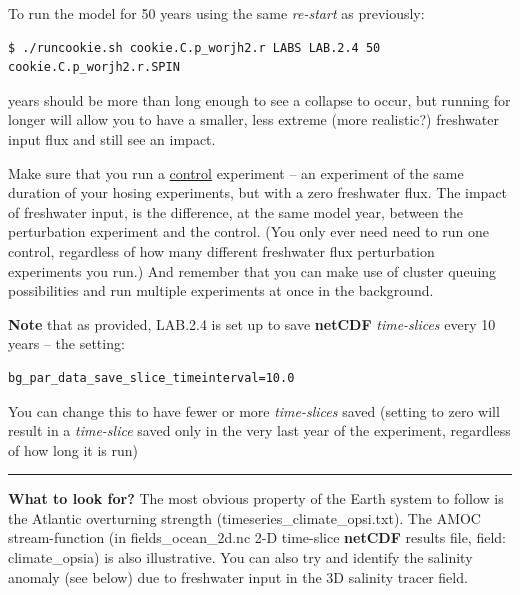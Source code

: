 \vspace{1mm}
To run the model for 50 years using the same \textit{re-start} as previously:

\vspace{-2mm}\small\begin{verbatim}
$ ./runcookie.sh cookie.C.p_worjh2.r LABS LAB.2.4 50 cookie.C.p_worjh2.r.SPIN
\end{verbatim}\normalsize\vspace{-2mm}

 years should be more than long enough to see a collapse to occur, but running for longer will allow you to have a smaller, less extreme (more realistic?) freshwater input flux and still see an impact.

Make sure that you run a \uline{control} experiment -- an experiment of the same duration of your hosing experiments, but with a zero freshwater flux. The impact of freshwater input, is the difference, at the same model year, between the perturbation experiment and the control. (You only ever need need to run one control, regardless of how many different freshwater flux perturbation experiments  you run.) And remember that you can make use of cluster queuing possibilities and run multiple experiments at once in the background.

\vspace{1mm}
\noindent \textbf{Note} that as provided, \textsf{\footnotesize LAB.2.4} is set up to save \textbf{netCDF} \textit{time-slices} every 10 years -- the setting:

\vspace{-2mm}\small\begin{verbatim}
bg_par_data_save_slice_timeinterval=10.0
\end{verbatim}\normalsize\vspace{-2mm}

You can change this to have fewer or more \textit{time-slices} saved (setting to zero will result in a \textit{time-slice} saved only in the very last year of the experiment, regardless of how long it is run)

\vspace{1mm}\noindent\rule{4cm}{0.5pt}\vspace{2mm}

\newpage

\noindent \textbf{What to look for?} The most obvious property of the Earth system to follow is the Atlantic overturning strength (\textsf{\footnotesize timeseries\_climate\_opsi.txt}). The AMOC stream-function (in \textsf{\footnotesize fields\_ocean\_2d.nc} 2-D time-slice \textbf{netCDF} results file, field: \textsf{\footnotesize climate\_opsia}) is also illustrative. You can also try and identify the salinity anomaly (see below) due to freshwater input in the 3D salinity tracer field.

